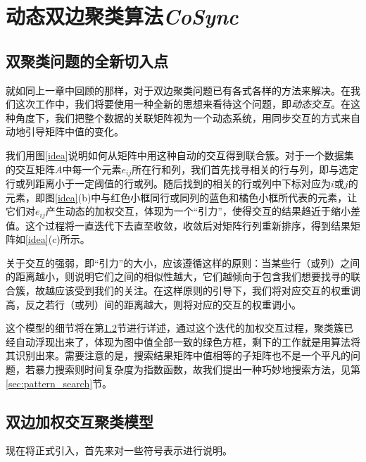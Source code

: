 
\chapter{动态双边聚类算法\emph{CoSync}}
\label{chapter:main}
\section{双聚类问题的全新切入点}
就如同上一章中回顾的那样，对于双边聚类问题已有各式各样的方法来解决。在我们这次工作中，我们将要使用一种全新的思想来看待这个问题，即\emph{动态交互}。在这种角度下，我们把整个数据的关联矩阵视为一个动态系统，用同步交互的方式来自动地引导矩阵中值的变化。

我们用图\ref{idea}说明如何从矩阵中用这种自动的交互得到联合簇。对于一个数据集的交互矩阵$A$中每一个元素$e_{ij}$所在行和列，我们首先找寻相关的行与列，即与选定行或列距离小于一定阈值的行或列。随后找到的相关的行或列中下标对应为$i$或$j$的元素，即图\ref{idea}(b)中与红色小框同行或同列的蓝色和橘色小框所代表的元素，让它们对$e_{ij}$产生动态的加权交互，体现为一个“引力”，使得交互的结果趋近于缩小差值。这个过程将一直迭代下去直至收敛，收敛后对矩阵行列重新排序，得到结果矩阵如\ref{idea}(c)所示。


关于交互的强弱，即“引力”的大小，应该遵循这样的原则：当某些行（或列）之间的距离越小，则说明它们之间的相似性越大，它们越倾向于包含我们想要找寻的联合簇，故越应该受到我们的关注。在这样原则的引导下，我们将对应交互的权重调高，反之若行（或列）间的距离越大，则将对应的交互的权重调小。

这个模型的细节将在第\ref{sec:main}节进行详述，通过这个迭代的加权交互过程，聚类簇已经自动浮现出来了，体现为图中值全部一致的绿色方框，剩下的工作就是用算法将其识别出来。需要注意的是，搜索结果矩阵中值相等的子矩阵也不是一个平凡的问题，若暴力搜索则时间复杂度为指数函数，故我们提出一种巧妙地搜索方法，见第\ref{sec:pattern_search}节。


\section{双边加权交互聚类模型\cosync}
\label{sec:main}
现在将正式引入，首先来对一些符号表示进行说明。

